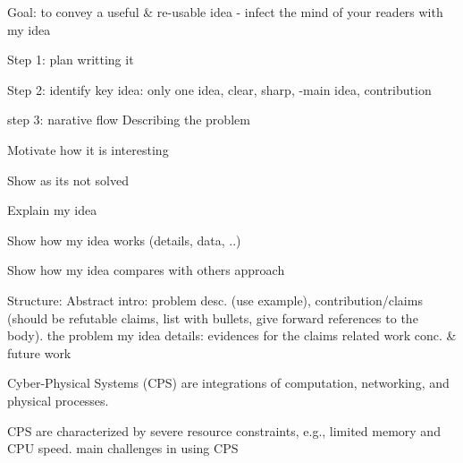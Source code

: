 Goal: to convey a useful & re-usable  idea
  - infect the mind of your readers with my idea
  
Step 1: plan writting it

Step 2: identify key idea: only one idea, clear, sharp,
-main idea, contribution 

step 3: narative flow
	Describing the problem

	Motivate how it is interesting

	Show as its not solved

	Explain my idea

	Show how my idea works (details, data, ..)

	Show how my idea compares with others approach

Structure: 
	Abstract
	intro: problem desc. (use example), contribution/claims (should be refutable claims, list with bullets, give forward references to the body).
	the problem
	my idea
	details: evidences for the claims
	related work
	conc. & future work
	

Cyber-Physical Systems (CPS) are integrations of computation, networking, and physical processes.

CPS are characterized by severe resource constraints, e.g., limited memory and CPU speed. main challenges in using CPS 
